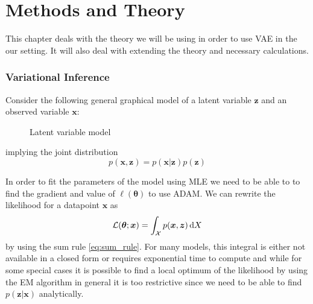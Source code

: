 \chapter{Methods and Theory}
\label{MethodsCh}

This chapter deals with the theory we will be using in order to use VAE in the
our setting. It will also deal with extending the theory and necessary calculations.

\subsection{Variational Inference}
Consider the following general graphical model of a latent variable $\bm{z}$ and
an observed variable $\bm{x}$:
\begin{figure}[H]
  \center
  \label{tikz:latent_variable_model}
  \caption{Latent variable model}
\end{figure}
implying the joint distribution
\begin{equation}
  \label{eq:latent_variable_model}
  p(\bm{x}, \bm{z}) = p(\bm{x} | \bm{z}) p(\bm{z})
\end{equation}

In order to fit the parameters of the model using MLE we need to be able to to
find the gradient and value of $\ell(\bm{\theta})$ to use ADAM. We can rewrite
the likelihood for a datapoint $\bm{x}$ as
\begin{equation}
  \label{eq:likelihood_integrate_out_latent}
  \mathcal{L}(\bm{\theta} ; \bm{x}) = \int_{\mathcal{X}} p(\bm{x}, \bm{z}) \dif X
\end{equation}
by using the sum rule \ref{eq:sum_rule}. For many models, this integral is
either not available in a closed form or requires exponential time to compute
\cite{blei_variational_2017} and while for some special cases it is possible to
find a local optimum of the likelihood by using the EM algorithm
\cite{Dempster77maximumlikelihood} in general it is too restrictive since we
need to be able to find $p(\bm{z} | \bm{x})$ analytically.

